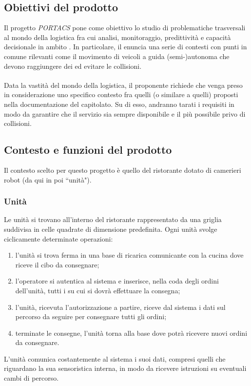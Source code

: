 \subsection{Obiettivi del prodotto}
Il progetto \textit{PORTACS} pone come obiettivo lo studio di problematiche trasversali al mondo della logistica fra cui analisi, monitoraggio, predittività e capacità decisionale in ambito . In particolare, il  enuncia una serie di contesti con punti in comune rilevanti come il movimento di veicoli a guida (semi-)autonoma che devono raggiungere dei  ed evitare le collisioni.
\\\\
Data la vastità del mondo della logistica, il proponente richiede che venga preso in considerazione uno specifico contesto fra quelli (o similare a quelli) proposti nella documentazione del capitolato. Su di esso, andranno tarati i requisiti in modo da garantire che il servizio sia sempre disponibile e il più possibile privo di collisioni.

\subsection{Contesto e funzioni del prodotto}
Il contesto scelto per questo progetto è quello del ristorante dotato di camerieri robot (da qui in poi ``unità").
    \subsubsection{Unità}
    Le unità si trovano all'interno del ristorante rappresentato da una griglia suddivisa in celle quadrate di dimensione predefinita. Ogni unità svolge ciclicamente determinate operazioni:
    \begin{enumerate}
        \item l'unità si trova ferma in una base di ricarica comunicante con la cucina dove riceve il cibo da consegnare;
        \item l'operatore si autentica al sistema e inserisce, nella coda degli ordini dell'unità, tutti i  su cui si dovrà effettuare la consegna;
        \item l'unità, ricevuta l'autorizzazione a partire, riceve dal sistema i dati sul percorso da seguire per consegnare tutti gli ordini;
        \item terminate le consegne, l'unità torna alla base dove potrà ricevere nuovi ordini da consegnare.
    \end{enumerate}
    L'unità comunica costantemente al sistema i suoi dati, compresi quelli che riguardano la sua sensoristica interna, in modo da ricevere istruzioni su eventuali cambi di percorso.

